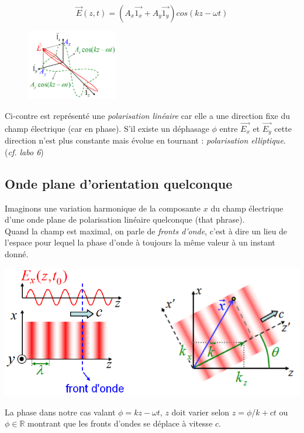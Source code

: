 \documentclass	[11pt, a4paper, openany]{book}
\begin{document}
\begin{equation}
\vec{E}(z,t) = (A_x\vec{1_x} + A_y \vec{1_y})cos(kz - \omega t)
\end{equation}

\begin{figure}
\includegraphics[width=4cm]{oo/image34.png}
\end{figure}
Ci-contre est représenté une \textit{polarisation linéaire} car elle a une direction fixe du champ électrique (car en phase). S'il existe un déphasage $\phi$ entre $\vec{E_x}$ et $\vec{E_y}$ cette direction n'est plus constante mais évolue en tournant : \textit{polarisation elliptique}. (\textit{cf. labo 6})

\subsection{Onde plane d'orientation quelconque}
Imaginons une variation harmonique de la composante $x$ du champ électrique d'une onde plane de polarisation linéaire quelconque (that phrase).\\
Quand la champ est maximal, on parle de \textit{fronts d'onde}, c'est à dire un lieu de l'espace pour lequel la phase d'onde à toujours la même valeur à un instant donné.
\begin{center}
\includegraphics[scale=0.4]{oo/image35.png}
\end{center}
La phase dans notre cas valant $\phi = kz - \omega t$, $z$ doit varier selon $z = \phi / k + ct$ ou $\phi \in \mathbb{R}$ montrant que les fronts d'ondes se déplace à vitesse $c$.\\
\end{document}
